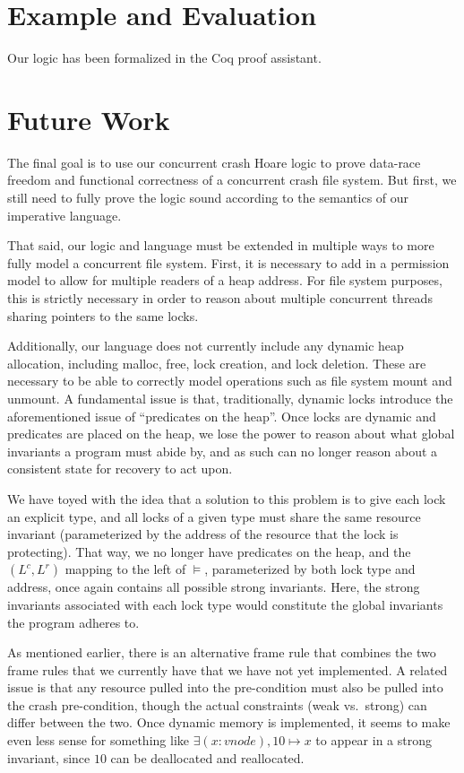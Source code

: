\section{Example and Evaluation}

Our logic has been formalized in the Coq proof assistant.


\section{Future Work}


The final goal is to use our concurrent crash Hoare logic to prove data-race
freedom and functional correctness of a concurrent crash file system.
But first,
we still need to fully prove the logic sound according to the semantics of our
imperative language.

That said, our logic and language must be extended in multiple ways to more
fully model a concurrent file system.
First, it is necessary to add in a
permission model to allow for multiple readers of a heap address.
For file
system purposes, this is strictly necessary in order to reason about multiple
concurrent threads sharing pointers to the same locks.

Additionally, our language does not currently include any dynamic heap
allocation, including malloc, free, lock creation, and lock deletion.
These are
necessary to be able to correctly model operations such as file system mount and
unmount.
A fundamental issue is that, traditionally, dynamic locks introduce the
aforementioned issue of ``predicates on the heap''.
Once locks are dynamic and
predicates are placed on the heap, we lose the power to reason about what global
invariants a program must abide by, and as such can no longer reason about a
consistent state for recovery to act upon.

We have toyed with the idea that a solution to this problem is to give each lock
an explicit type, and all locks of a given type must share the same resource
invariant (parameterized by the address of the resource that the lock is
protecting).
That way, we no longer have predicates on the heap, and the
$(L^c,L^r)$ mapping to the left of $\vDash$, parameterized by both lock type and
address, once again contains all possible strong invariants. Here, the strong
invariants associated with each lock type would constitute the global invariants
the program adheres to.

As mentioned earlier, there is an alternative frame rule that combines the two
frame rules that we currently have that we have not yet implemented.
A related
issue is that any resource pulled into the pre-condition must also be pulled
into the crash pre-condition, though the actual constraints (weak vs.\ strong)
can differ between the two.
Once dynamic memory is implemented, it seems to make
even less sense for something like $\exists (x:vnode), 10\mapsto x$ to appear in
a strong invariant, since $10$ can be deallocated and reallocated.

